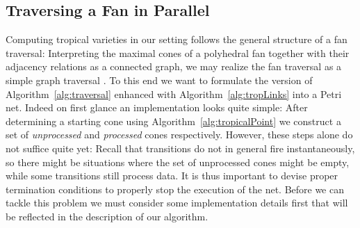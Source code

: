 \documentclass[
  paper=a4,
  titlepage,
  bibliography=totoc,
  listof=totoc,
  pagesize=pdftex
]{scrartcl}
\numberwithin{figure}{section}
\numberwithin{equation}{section}
\numberwithin{table}{section}
\theoremstyle{definition}
\numberwithin{definition}{section}
\begin{document}

\subsection{Traversing a Fan in Parallel}
\label{sec:traverseParal}

Computing tropical varieties in our setting follows the general structure of a fan
traversal: Interpreting the maximal cones of a polyhedral fan together with their
adjacency relations as a connected graph, we may realize the fan traversal as a simple
graph traversal \cite{JenTravSym}. To this end we want to formulate the version of
Algorithm~\ref{alg:traversal} enhanced with Algorithm~\ref{alg:tropLinks} into a Petri
net. Indeed on first glance an implementation looks quite simple: After determining a
starting cone using Algorithm~\ref{alg:tropicalPoint} we construct a set of
\emph{unprocessed} and \emph{processed} cones respectively. However, these steps alone do
not suffice quite yet: Recall that transitions do not in general fire instantaneously, so
there might be situations where the set of unprocessed cones might be empty, while some
transitions still process data. It is thus important to devise proper termination
conditions to properly stop the execution of the net. Before we can tackle this problem we
must consider some implementation details first that will be reflected in the description
of our algorithm.
\end{document}

